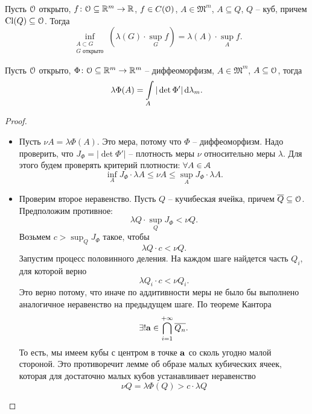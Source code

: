 \begin{lemma}
    Пусть $\mathcal{O}$ открыто, $f \colon \mathcal{O} \subseteq \mathbb{R}^m \to \mathbb{R}$, $f \in C(\mathcal{O})$, 
    $A \in \mathfrak{M}^m$, $A \subseteq Q$, $Q$ -- куб, причем $\operatorname{Cl}(Q) \subseteq \mathcal{O}$. 
    Тогда
    \[
        \inf_{\substack{A \subset G \\ G \text{ открыто}}}
        {\left(\lambda(G) \cdot \sup_{G}{f}\right)} = \lambda(A) \cdot \sup_{A}{f}
    .\] 
\end{lemma}
{
\begin{theorem}
    Пусть $\mathcal{O}$ открыто, $\Phi \colon \mathcal{O} \subseteq \mathbb{R}^m \to \mathbb{R}^m$ -- диффеоморфизм,
    $A \in \mathfrak{M}^m$, $A \subseteq \mathcal{O}$, тогда
    \[
        \lambda \Phi(A) = \int\limits_{A}{|\det{\Phi'}| \,\mathrm{d}\lambda_m}
    .\] 
\end{theorem}
\begin{proof}
    \enewline
    \begin{itemize}
        \item Пусть $\nu{A} = \lambda{\Phi(A)}$. Это мера, потому что $\Phi$ -- диффеоморфизм. Надо проверить,
            что $J_\Phi = |\det{\Phi'}|$ -- плотность меры $\nu$ относительно меры $\lambda$. Для этого
            будем проверять критерий плотности: $\forall A \in \mathcal{A}$
            \[
                \inf_A{J_\Phi} \cdot \lambda{A} \leqslant \nu{A} \leqslant \sup_A{J_\Phi} \cdot \lambda{A}
            .\]
        \item Проверим второе неравенство. Пусть $Q$ -- кучибеская ячейка, причем $\overline{Q} \subseteq \mathcal{O}$.
            Предположим противное:
            \[
                \lambda{Q} \cdot \sup_Q{J_\Phi} < \nu{Q}
            .\]
            Возьмем $c > \sup_Q{J_\Phi}$ такое, чтобы
            \[
                \lambda{Q} \cdot c < \nu{Q}
            .\]
            Запустим процесс половинного деления. На каждом шаге найдется часть $Q_i$, для которой
            верно
            \[
                \lambda{Q_i} \cdot c < \nu{Q_i}
            .\]
            Это верно потому, что иначе по аддитивности меры не было бы выполнено аналогичное неравенство
            на предыдущем шаге. По теореме Кантора
            \[
                \exists! \mathbf{a} \in \bigcap_{i = 1}^{+\infty}{\overline{Q_n}}
            .\]
            То есть, мы имеем кубы с центром в точке $\mathbf{a}$ со сколь угодно малой стороной. Это
            противоречит лемме об образе малых кубических ячеек, которая для достаточно малых кубов
            устанавливает неравенство
            \[
                \nu{Q} = \lambda{\Phi(Q)} > c \cdot \lambda{Q}
\]
\end{itemize}
\end{proof}}

